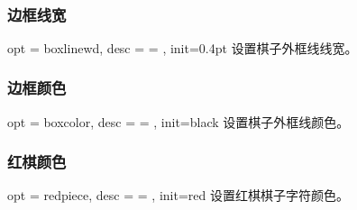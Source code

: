 \documentclass[full]{l3doc}
\begin{document}
\begin{documentation}
\begin{SideBySideExample}[frame=single,numbers=left,
                xrightmargin=.55\linewidth,gobble=2]
  \centering
  \cchessboard[piecetype=o]\quad
  \cchessboard[piecetype=oo]\\
  \cchessboard[piecetype=ooo]
\end{SideBySideExample}

\bigskip

\subsubsection{边框线宽}

\begin{option}{ opt = boxlinewd, desc = {= }, init=0.4pt }
  设置棋子外框线线宽。
\end{option}

\begin{SideBySideExample}[frame=single,numbers=left,
                xrightmargin=.60\linewidth,gobble=2]
  \centering
  \cchessboard[boxlinewd=0.8pt]
\end{SideBySideExample}

\bigskip

\subsubsection{边框颜色}

\begin{option}{ opt = boxcolor, desc = {= }, init=black }
  设置棋子外框线颜色。
\end{option}

\begin{SideBySideExample}[frame=single,numbers=left,
                xrightmargin=.60\linewidth,gobble=2]
  \centering
  \cchessboard[boxcolor=white]
\end{SideBySideExample}

\bigskip

\subsubsection{红棋颜色}

\begin{option}{ opt = redpiece, desc = {= }, init=red }
  设置红棋棋子字符颜色。
\end{option}


\end{documentation}
\end{document}
